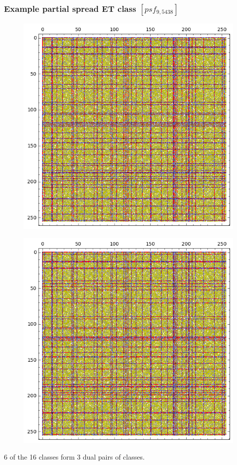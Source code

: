 \documentclass[pdf,sprung,slideColor,nocolorBG]{beamer}
\newenvironment{colortheme}[1]{
\def\ProvidesPackageRCS $##1${\relax}
\renewcommand{\ProcessOptions}{\relax}
\makeatletter

\makeatother
}{}
\begin{document}
\begin{colortheme}{jubata}
\begin{frame}
\frametitle{Example partial spread ET class $[psf_{9,5438}]$}
\begin{figure}
\centering
\begin{minipage}{.48\textwidth}
  \centering
  \includegraphics[width=.9\linewidth]{../matrix_plot/psf_9_5438_bent_cayley_graph_index_matrix.png}
  \label{fig:psf_9_5438_bent_cayley_graph_index_matrix}
\end{minipage}
\begin{minipage}{.48\textwidth}
  \centering
  \includegraphics[width=.9\linewidth]{../matrix_plot/psf_9_5438_dual_cayley_graph_index_matrix.png}
  \label{fig:psf_9_5438_dual_cayley_graph_index_matrix}
\end{minipage}%
\end{figure}
6 of the 16 classes form 3 dual pairs of classes.
\end{frame}

\end{colortheme}
\end{document}
